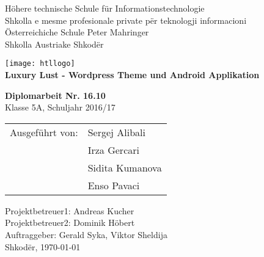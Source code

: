 
\newcommand{\trtitle}{Luxury Lust - Wordpress Theme und Android Applikation}
\newcommand{\trort}{Shkod\"er}
\newcommand{\trbetreuer}{Titel Betreuer}
\newcommand{\trdate}{\today}
\newcommand{\trnumber}{16.10}
\newcommand{\trclass}{5A}
\newcommand{\trschuelereins}{Sergej Alibali}
\newcommand{\trschuelerzwei}{Irza Gercari}
\newcommand{\trschuelerdrei}{Sidita Kumanova}
\newcommand{\trschuelervier}{Enso Pavaci}
\newcommand{\trsauftraggeber}{Gerald Syka, Viktor Sheldija}
\newcommand{\trbetreuereins}{Andreas Kucher}
\newcommand{\trbetreuerzwei}{Dominik H\"obert}

\thispagestyle{empty}

\begin{center}
  \large H\"ohere technische Schule f\"ur Informationstechnologie \\
  \large Shkolla e mesme profesionale private p\"er teknologji informacioni \\
  \Huge \"Osterreichiche Schule \glqq Peter Mahringer\grqq \\
  \Large Shkolla Austriake Shkod\"er
\end{center}

\begin{center}
  \texttt{[image: htllogo]} \\
  \textbf{\LARGE \trtitle}
\end{center}
\vspace{1cm}

\begin{flushleft}
\textbf{\LARGE Diplomarbeit Nr. \trnumber} \\
\LARGE Klasse \trclass{}, Schuljahr 2016/17

\begin{table}[htbp]
\Large
\begin{tabular}{cl}
   Ausgef\"uhrt von: & \trschuelereins \\ 
   & \trschuelerzwei \\ 
   & \trschuelerdrei \\ 
   & \trschuelervier \\ 
 \end{tabular}
\end{table}
\end{flushleft}


\large Projektbetreuer1: \trbetreuereins\\
\large Projektbetreuer2: \trbetreuerzwei\\
\large Auftraggeber: \trsauftraggeber\\
\newline
\large \trort{}, \today

\vfill